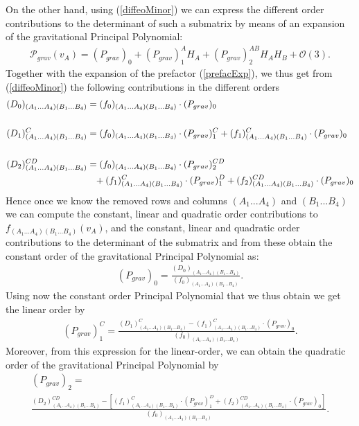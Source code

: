 \documentclass[a4paper,12pt, DIV=14, BCOR=5mm, twoside, headsepline, numbers=noenddot]{scrbook}
\begin{document}
On the other hand, using (\ref{diffeoMinor}) we can express the different order contributions to the determinant of such a submatrix by means of an expansion of the gravitational Principal Polynomial:
\begin{align}
    \mathcal{P}_{grav}(v_A) = (P_{grav})_{0} + (P_{grav})^A_1 H_A+ (P_{grav})^{AB}_2 H_A H_B +\mathcal{O}(3).
\end{align}
Together with the expansion of the prefactor (\ref{prefacExp}), we thus get from (\ref{diffeoMinor}) the following contributions in the different orders
\begin{align}\label{minorPoly}
    \begin{aligned}
    (D_0)_{(A_1...A_4)(B_1...B_4)}  &= (f_0)_{(A_1...A_4)(B_1...B_4)} \cdot (P_{grav})_0 \\
    \\
    (D_1)^C_{(A_1...A_4)(B_1...B_4)}  &= (f_0)_{(A_1...A_4)(B_1...B_4)} \cdot (P_{grav})^C_1 + (f_1)^C_{(A_1...A_4)(B_1...B_4)} \cdot (P_{grav})_0  \\
    \\
    (D_2)^{CD}_{(A_1...A_4)(B_1...B_4)}  &=  (f_0)_{(A_1...A_4)(B_1...B_4)} \cdot (P_{grav})_2^{CD} \\
     & \hphantom{=} +
     (f_1)^C_{(A_1...A_4)(B_1...B_4)} \cdot (P_{grav})_1^D +(f_2)^{CD}_{(A_1...A_4)(B_1...B_4)} \cdot (P_{grav})_0 
    \end{aligned}
\end{align}
Hence once we know the removed rows and columns $(A_1...A_4)$ and $(B_1...B_4)$ we can compute the constant, linear and quadratic order contributions to $f_{(A_1...A_4)(B_1...B_4)}(v_A)$, and the constant, linear and quadratic order contributions to the determinant of the submatrix and from these obtain the constant order of the gravitational Principal Polynomial as:
\begin{align}\label{POLY1}
(P_{grav})_0 = \frac{(D_0)_{(A_1...A_4)(B_1...B_4)}}{(f_0)_{(A_1...A_4)(B_1...B_4)}}.
\end{align}
Using now the constant order Principal Polynomial that we thus obtain we get the linear order by
\begin{align}\label{POLY2}
    (P_{grav})^C_1= \frac{(D_1)^C_{(A_1...A_4)(B_1...B_4)} - (f_1)^C_{(A_1...A_4)(B_1...B_4)} \cdot (P_{grav})_0}{(f_0)_{(A_1...A_4)(B_1...B_4)}}.
\end{align}
Moreover, from this expression for the linear-order, we can obtain the quadratic order of the gravitational Principal Polynomial by 
\begin{multline}\label{POLY3}
    (P_{grav})_2 = \\
    \frac{(D_2)^{CD}_{(A_1...A_4)(B_1...B_4)}-\left [ (f_1)^C_{(A_1...A_4)(B_1...B_4)} \cdot (P_{grav})^D_1  +(f_2)^{CD}_{(A_1...A_4)(B_1...B_4)} \cdot (P_{grav})_0 \right ]}{(f_0)_{(A_1...A_4)(B_1...B_4)}}.
\end{multline}
\end{document}

